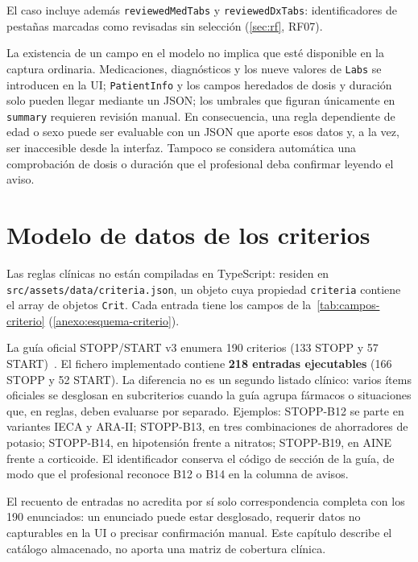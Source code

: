 El caso incluye además \texttt{reviewedMedTabs} y \texttt{reviewedDxTabs}:
identificadores de pestañas marcadas como revisadas sin selección
(\cref{sec:rf}, RF07).

La existencia de un campo en el modelo no implica que esté disponible en
la captura ordinaria. Medicaciones, diagnósticos y los nueve valores de
\texttt{Labs} se introducen en la UI; \texttt{PatientInfo} y los campos
heredados de dosis y duración solo pueden llegar mediante un JSON; los
umbrales que figuran únicamente en \texttt{summary} requieren revisión
manual. En consecuencia, una regla dependiente de edad o sexo puede ser
evaluable con un JSON que aporte esos datos y, a la vez, ser inaccesible
desde la interfaz. Tampoco se considera automática una comprobación de
dosis o duración que el profesional deba confirmar leyendo el aviso.

\section{Modelo de datos de los criterios}
\label{sec:modelo-criterios}

Las reglas clínicas no están compiladas en TypeScript: residen en
\texttt{src/assets/data/criteria.json}, un objeto cuya propiedad
\texttt{criteria} contiene el array de objetos \texttt{Crit}. Cada entrada
tiene los campos de la~\cref{tab:campos-criterio}
(\cref{anexo:esquema-criterio}).

La guía oficial STOPP/START v3 enumera 190 criterios (133 STOPP y
57 START)~\cite{omahony2023stopp,sacyl2023stopp}. El fichero implementado
contiene \textbf{218 entradas ejecutables} (166 STOPP y 52 START). La
diferencia no es un segundo listado clínico: varios ítems oficiales se
desglosan en subcriterios cuando la guía agrupa fármacos o situaciones que,
en reglas, deben evaluarse por separado. Ejemplos: STOPP-B12 se parte en
variantes IECA y ARA-II; STOPP-B13, en tres combinaciones de ahorradores de
potasio; STOPP-B14, en hipotensión frente a nitratos; STOPP-B19, en AINE
frente a corticoide. El identificador conserva el código de sección de la
guía, de modo que el profesional reconoce B12 o B14 en la columna de
avisos.

El recuento de entradas no acredita por sí solo correspondencia completa
con los 190 enunciados: un enunciado puede estar desglosado, requerir datos
no capturables en la UI o precisar confirmación manual. Este capítulo
describe el catálogo almacenado, no aporta una matriz de cobertura clínica.

